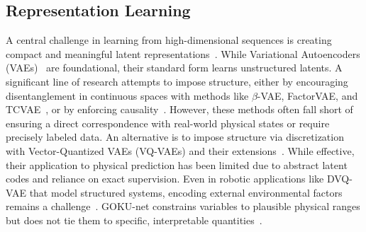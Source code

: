 \documentclass[sigconf]{acmart}
\begin{document}
\subsection{Representation Learning}



 
A central challenge in learning from high-dimensional sequences is creating compact and meaningful latent representations~\cite[]{shi2015convolutional,bai2018empirical}. While Variational Autoencoders (VAEs)~\cite[]{kingma2013auto} are foundational, their standard form learns unstructured latents. A significant line of research attempts to impose structure, either by encouraging disentanglement in continuous spaces with methods like \(\beta\)-VAE, FactorVAE, and TCVAE~\cite[]{higgins2017beta, kim2018disentangling, chen2018isolating}, or by enforcing causality~\cite[]{yang2021causalvae}. However, these methods often fall short of ensuring a direct correspondence with real-world physical states or require precisely labeled data. An alternative is to impose structure via discretization with Vector-Quantized VAEs (VQ-VAEs) and their extensions~\cite[]{van2017neural, razavi2019generating, xue2019supervised}. While effective, their application to physical prediction has been limited due to abstract latent codes and reliance on exact supervision. Even in robotic applications like DVQ-VAE that model structured systems, encoding external environmental factors remains a challenge~\cite[]{zhao2024decomposed}. GOKU-net constrains variables to plausible physical ranges but does not tie them to specific, interpretable quantities~\cite[]{linial_generative_2021}.
\end{document}
